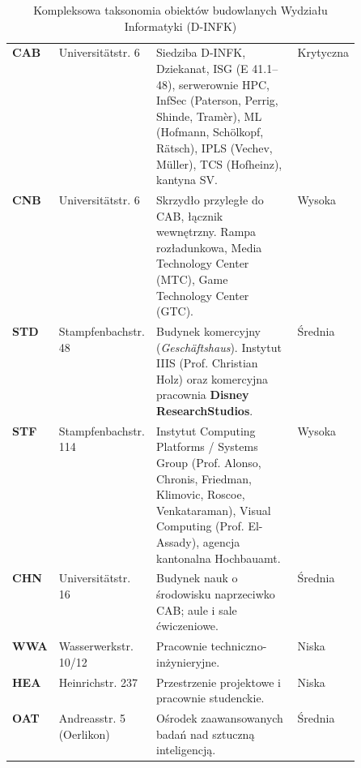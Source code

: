 \begin{table}[H]
    \centering
    \caption{Kompleksowa taksonomia obiektów budowlanych Wydziału Informatyki (D-INFK)}\label{tab:budynki-dinfk}
    \tablefont
    \begin{tabularx}{\linewidth}{C{0.12\linewidth} L{0.24\linewidth} Y C{0.14\linewidth}}
        \toprule
         &  &  &  \\
        \midrule
        \textbf{CAB} & Universitätstr. 6 & Siedziba D-INFK, Dziekanat, ISG (E 41.1--48), serwerownie HPC, InfSec (Paterson, Perrig, Shinde, Tramèr), ML (Hofmann, Schölkopf, Rätsch), IPLS (Vechev, Müller), TCS (Hofheinz), kantyna SV. & Krytyczna \\
        \textbf{CNB} & Universitätstr. 6 & Skrzydło przyległe do CAB, łącznik wewnętrzny. Rampa rozładunkowa, Media Technology Center (MTC), Game Technology Center (GTC). & Wysoka \\
        \textbf{STD} & Stampfenbachstr. 48 & Budynek komercyjny (\textit{Geschäftshaus}). Instytut IIIS (Prof. Christian Holz) oraz komercyjna pracownia \textbf{Disney Research\textbar{}Studios}. & Średnia \\
        \textbf{STF} & Stampfenbachstr. 114 & Instytut Computing Platforms / Systems Group (Prof. Alonso, Chronis, Friedman, Klimovic, Roscoe, Venkataraman), Visual Computing (Prof. El-Assady), agencja kantonalna Hochbauamt. & Wysoka \\
        \textbf{CHN} & Universitätstr. 16 & Budynek nauk o środowisku naprzeciwko CAB; aule i sale ćwiczeniowe. & Średnia \\
        \textbf{WWA} & Wasserwerkstr. 10/12 & Pracownie techniczno-inżynieryjne. & Niska \\
        \textbf{HEA} & Heinrichstr. 237 & Przestrzenie projektowe i pracownie studenckie. & Niska \\
        \textbf{OAT} & Andreasstr. 5 (Oerlikon) & Ośrodek zaawansowanych badań nad sztuczną inteligencją. & Średnia \\
        \bottomrule
    \end{tabularx}
\end{table}



